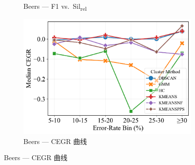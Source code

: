 \documentclass[10pt]{article} %
\numberwithin{equation}{section}
\begin{document}
\begin{figure}[htbp]
\begin{subfigure}[b]{0.33\linewidth}
    \caption{Beers — F1 vs.\ Sil\textsubscript{rel}}
    \label{fig:be_f1_sil}
  \end{subfigure}\hfill
  \begin{subfigure}[b]{0.33\linewidth}
    \includegraphics[width=\linewidth]{figures/6.4.3graph/CEGR_5pct_beers.pdf}
    \caption{Beers — CEGR 曲线}
    \label{fig:be_cegr}
  \end{subfigure}


\end{figure}
\end{document}
